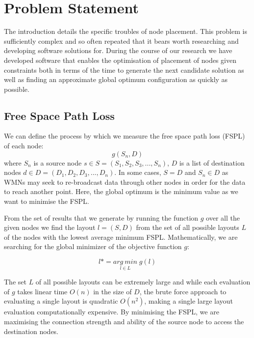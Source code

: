 \section{Problem Statement}
	\label{sec:problem}
	The introduction details the specific troubles of node placement. This problem is sufficiently complex and so often repeated that it bears worth researching and developing software solutions for. During the course of our research we have developed software that enables the optimisation of placement of nodes given constraints both in terms of the time to generate the next candidate solution as well as finding an approximate global optimum configuration as quickly as possible.
	
	\subsection{Free Space Path Loss}
		\label{sec:problem_FSPL} 
		We can define the process by which we measure the free space path loss (FSPL) \cite{monebhurrun2019standard} of each node:
		\begin{equation}
			g(S_n, D)
		\end{equation}
		where $S_n$ is a source node $s \in S = (S_1, S_2, S_3, ..., S_n)$, $D$ is a list of destination nodes $d \in D = (D_1, D_2, D_3, ..., D_n)$. In some cases, $S = D$ and $S_n \in D$ as WMNs may seek to re-broadcast data through other nodes in order for the data to reach another point. Here, the global optimum is the minimum value as we want to minimise the FSPL.
		
		From the set of results that we generate by running the function $g$ over all the given nodes we find the layout $l = (S, D)$ from the set of all possible layouts $L$ of the nodes with the lowest average minimum FSPL. Mathematically, we are searching for the global minimizer of the objective function $g$:

		\begin{equation}
			l* = \underset{l \in L}{arg\: min}\; g(l)
		\end{equation}

		The set $L$ of all possible layouts can be extremely large and while each evaluation of $g$ takes linear time $O(n)$ in the size of $D$, the brute force approach to evaluating a single layout is quadratic $O(n^2)$, making a single large layout evaluation computationally expensive. By minimising the FSPL, we are maximising the connection strength and ability of the source node to access the destination nodes.
